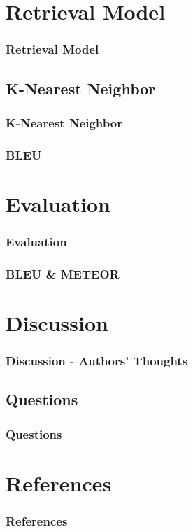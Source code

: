 \documentclass[xcolor=dvipsnames]{beamer}
\begin{document}
	\section{Retrieval Model}
		
		\begin{frame}
			\frametitle{Retrieval Model}
			
		\end{frame}
		
		\subsection{K-Nearest Neighbor}
			
			\begin{frame}
				\frametitle{K-Nearest Neighbor}
				
			\end{frame}
			
			\begin{frame}
				\frametitle{BLEU}
				
			\end{frame}
	
	\section{Evaluation}
		
		\begin{frame}
			\frametitle{Evaluation}
			
		\end{frame}
	
		\begin{frame}
			\frametitle{BLEU \& METEOR}
			
		\end{frame}
	
	\section{Discussion}
		
		\begin{frame}
			\frametitle{Discussion - Authors' Thoughts}
			
		\end{frame}
	
		\subsection{Questions}
			
			\begin{frame}
				\frametitle{Questions}
				
			\end{frame}
	
	
	\section{References}
		
		\begin{frame}[allowframebreaks]
			\frametitle{References}
			\begin{footnotesize}
				
				
			\end{footnotesize}
		\end{frame}

		
	
\end{document}
